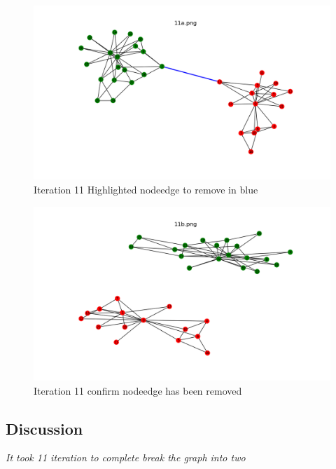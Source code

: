 \documentclass[12pt]{article}
\begin{document}
\begin{figure}[H]
\centering
\includegraphics[trim=0 0 0 0, clip, width=\textwidth] {11a.png}
\caption{Iteration 11 Highlighted nodeedge to remove in blue }
\label{fig:q111a}
\end{figure}
\begin{figure}[H]
\centering
\includegraphics[trim=0 0 0 0, clip, width=\textwidth] {11b.png}
\caption{Iteration 11 confirm nodeedge has been removed }
\label{fig:q111b}
\end{figure}


\subsection*{Discussion}

\emph{It took 11 iteration to complete break the graph into two}
\end{document}
